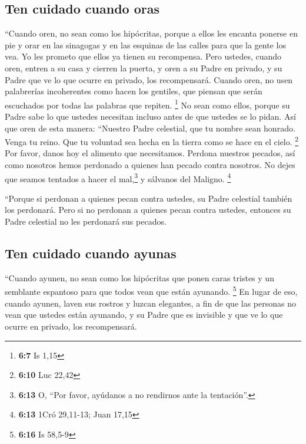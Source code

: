 \hypertarget{ten-cuidado-cuando-oras}{%
\subsection{Ten cuidado cuando oras}\label{ten-cuidado-cuando-oras}}

 ``Cuando oren, no sean como los hipócritas, porque a
ellos les encanta ponerse en pie y orar en las sinagogas y en las
esquinas de las calles para que la gente los vea. Yo les prometo que
ellos ya tienen su recompensa.  Pero ustedes, cuando oren,
entren a su casa y cierren la puerta, y oren a su Padre en privado, y su
Padre que ve lo que ocurre en privado, los recompensará. 
Cuando oren, no usen palabrerías incoherentes como hacen los gentiles,
que piensan que serán escuchados por todas las palabras que repiten.
\footnote{\textbf{6:7} Is 1,15}  No sean como ellos,
porque su Padre sabe lo que ustedes necesitan incluso antes de que
ustedes se lo pidan.  Así que oren de esta manera:
``Nuestro Padre celestial, que tu nombre sean honrado. 
Venga tu reino. Que tu voluntad sea hecha en la tierra como se hace en
el cielo. \footnote{\textbf{6:10} Luc 22,42}  Por favor,
danos hoy el alimento que necesitamos.  Perdona nuestros
pecados, así como nosotros hemos perdonado a quienes han pecado contra
nosotros.  No dejes que seamos tentados a hacer el
mal,\footnote{\textbf{6:13} O, ``Por favor, ayúdanos a no rendirnos ante
  la tentación''.} y sálvanos del Maligno. \footnote{\textbf{6:13} 1Cró
  29,11-13; Juan 17,15}

 ``Porque si perdonan a quienes pecan contra ustedes, su
Padre celestial también los perdonará.  Pero si no
perdonan a quienes pecan contra ustedes, entonces su Padre celestial no
les perdonará sus pecados.

\hypertarget{ten-cuidado-cuando-ayunas}{%
\subsection{Ten cuidado cuando ayunas}\label{ten-cuidado-cuando-ayunas}}

 ``Cuando ayunen, no sean como los hipócritas que ponen
caras tristes y un semblante espantoso para que todos vean que están
ayunando. \footnote{\textbf{6:16} Is 58,5-9}  En lugar de
eso, cuando ayunen, laven sus rostros y luzcan elegantes,
 a fin de que las personas no vean que ustedes están
ayunando, y su Padre que es invisible y que ve lo que ocurre en privado,
los recompensará.

